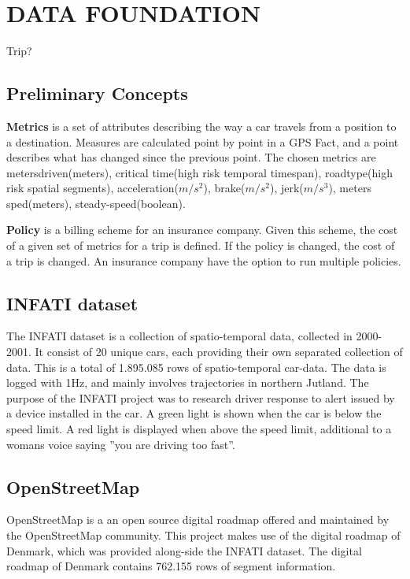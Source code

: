 \section{DATA FOUNDATION}\label{sec:datafound}




Trip?



\subsection{Preliminary Concepts}\label{subsec:precon}
\textbf{Metrics} is a set of attributes describing the way a car travels from a position  to a destination. Measures are calculated point by point in a GPS Fact, and a point describes what has changed since the previous point. The chosen metrics are metersdriven(meters), critical time(high risk temporal timespan), roadtype(high risk spatial segments), acceleration($m/s^2$), brake($m/s^2$), jerk($m/s^3$), meters sped(meters), steady-speed(boolean). 

\textbf{Policy} is a billing scheme for an insurance company. Given this scheme, the cost of a given set of metrics for a trip is defined. If the policy is changed, the cost of a trip is changed. An insurance company have the option to run multiple policies.

\subsection{INFATI dataset}
The INFATI dataset\cite{art:INFATI} is a collection of spatio-temporal data, collected in 2000-2001. It consist of 20 unique cars, each providing their own separated collection of data. This is a total of 1.895.085 rows of spatio-temporal car-data. The data is logged with 1Hz, and mainly involves trajectories in northern Jutland. The purpose of the INFATI\cite{art:INFATI} project was to research driver response to alert issued by a device installed in the car. A green light is shown when the car is below the speed limit. A red light is displayed when above the speed limit, additional to a womans voice saying ''you are driving too fast''.

\subsection{OpenStreetMap}
OpenStreetMap\cite{osm} is a an open source digital roadmap offered  and maintained by the OpenStreetMap community. This project makes use of the digital roadmap of Denmark, which was provided along-side the INFATI dataset\cite{art:INFATI}. The digital roadmap of Denmark contains 762.155 rows of segment information.